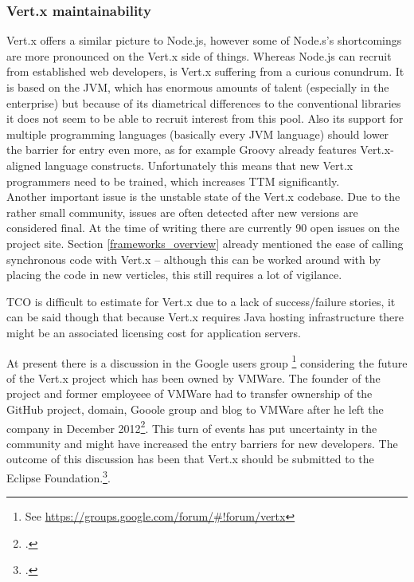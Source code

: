\subsubsection{Vert.x maintainability}
\label{vertx_maintainability}
Vert.x offers a similar picture to Node.js, however some of Node.s's shortcomings are
more pronounced on the Vert.x side of things. Whereas Node.js can recruit from
established web developers, is Vert.x suffering from a curious conundrum. It is
based on the JVM, which has enormous amounts of talent (especially in the enterprise)
but because of its diametrical differences to the conventional libraries it does
not seem to be able to recruit interest from this pool. Also its support for
multiple programming languages (basically every JVM language) should lower the
barrier for entry even more, as for example Groovy already features
Vert.x-aligned language constructs. Unfortunately this means that new Vert.x
programmers need to be trained, which increases TTM significantly.\\
Another important issue is the unstable state of the Vert.x codebase. Due to the
rather small community, issues are often detected after new versions are considered final.
At the time of writing there are currently 90 open issues on the project site.
Section \ref{frameworks_overview} already mentioned the ease of calling synchronous code with Vert.x  – although this
can be worked around with by placing the code in new verticles, this still
requires a lot of vigilance.

TCO is difficult to estimate for Vert.x due to a lack of success/failure stories,
it can be said though that because Vert.x requires Java hosting infrastructure
there might be an associated licensing cost for application servers.


At present there is a discussion in the Google users group \footnote{See \url{https://groups.google.com/forum/\#!forum/vertx}} considering the future of the Vert.x project which has been owned by VMWare. The founder of the project and
former employeee of VMWare had to transfer ownership of the GitHub project,
domain, Gooole group and blog to VMWare after he left the company in December
2012\footcite[Cf.][]{Vertx_announcement_2013}. This turn of events has put
uncertainty in the community and might have increased the entry barriers for new
developers. The outcome of this discussion has been that Vert.x should be submitted to
the Eclipse Foundation.\footcite[Cf.][]{Vertx_future_2013}.

